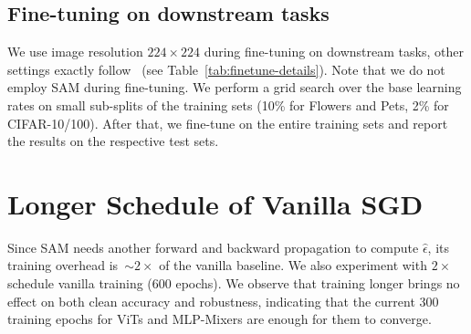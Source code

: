 \subsection{Fine-tuning on downstream tasks}
We use image resolution $224\times 224$ during fine-tuning on downstream tasks, other settings exactly follow~\cite{dosovitskiy2021an, tolstikhin2021mlpmixer} (see Table~\ref{tab:finetune-details}). 
Note that we do not employ SAM during fine-tuning.
We perform a grid search over the base learning rates on small sub-splits of the training sets (10\% for Flowers and Pets, 2\% for CIFAR-10/100).
After that, we fine-tune on the entire training sets and report the results on the respective test sets.

\begin{table}
    \caption{Hyperparameters for downstream tasks. All models are fine-tuned with $224\times 224$ resolution, a batch size of 512, cosine learning rate decay, no weight decay, and grad clipping at global norm 1.
    }
    \label{tab:finetune-details}
    \centering
\end{table}

\section{Longer Schedule of Vanilla SGD}
\label{sec:longer}
Since SAM needs another forward and backward propagation to compute $\hat{\epsilon}$, its training overhead is~$\sim 2\times$ of the vanilla baseline. We also experiment with $2\times$ schedule vanilla training (600 epochs).
We observe that training longer brings no effect on both clean accuracy and robustness, indicating that the current 300 training epochs for ViTs and MLP-Mixers are enough for them to converge.






